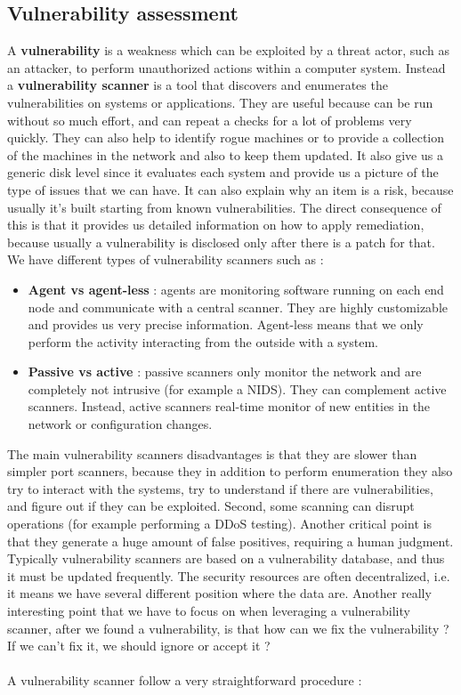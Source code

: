 \documentclass[11pt]{article}
\begin{document}
\subsection{Vulnerability assessment}
A \textbf{vulnerability} is a weakness which can be exploited by a threat actor, such as an attacker, to perform unauthorized actions within a computer system. Instead a \textbf{vulnerability scanner} is a tool that discovers and enumerates the vulnerabilities on systems or applications. They are useful because can be run without so much effort, and can repeat a checks for a lot of problems very quickly. They can also help to identify rogue machines or to provide a collection of the machines in the network and also to keep them updated. It also give us a generic disk level since it evaluates each system and provide us a picture of the type of issues that we can have. It can also explain why an item is a risk, because usually it's built starting from known vulnerabilities. The direct consequence of this is that it provides us detailed information on how to apply remediation, because usually a vulnerability is disclosed only after there is a patch for that. We have different types of vulnerability scanners such as :
\begin{itemize}
\item \textbf{Agent vs agent-less} : agents are monitoring software running on each end node and communicate with a central scanner. They are highly customizable and provides us very precise information. Agent-less means that we only perform the activity interacting from the outside with a system.
\item \textbf{Passive vs active} : passive scanners only monitor the network and are completely not intrusive (for example a NIDS). They can complement active scanners. Instead, active scanners real-time monitor of new entities in the network or configuration changes.
\end{itemize}
The main vulnerability scanners disadvantages is that they are slower than simpler port scanners, because they in addition to perform enumeration they also try to interact with the systems, try to understand if there are vulnerabilities, and figure out if they can be exploited. Second, some scanning can disrupt operations (for example performing a DDoS testing). Another critical point is that they generate a huge amount of false positives, requiring a human judgment. Typically vulnerability scanners are based on a vulnerability database, and thus it must be updated frequently. The security resources are often decentralized, i.e. it means we have several different position where the data are. Another really interesting point that we have to focus on when leveraging a vulnerability scanner, after we found a vulnerability, is that how can we fix the vulnerability ? If we can't fix it, we should ignore or accept it ?\\\\A vulnerability scanner follow a very straightforward procedure :
\end{document}

